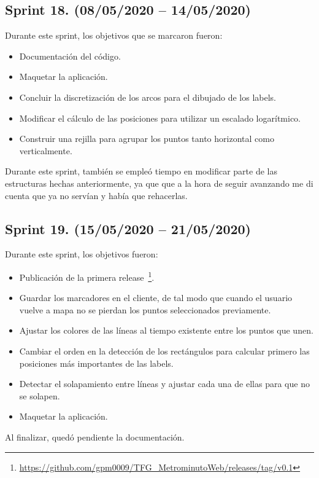 \subsection{Sprint 18. (08/05/2020 -- 14/05/2020)}
Durante este sprint, los objetivos que se marcaron fueron:
\begin{itemize}
	\item Documentación del código.
	\item Maquetar la aplicación.
	\item Concluir la discretización de los arcos para el dibujado de los labels.
	\item Modificar el cálculo de las posiciones para utilizar un escalado logarítmico.
	\item Construir una rejilla para agrupar los puntos tanto horizontal como verticalmente.
\end{itemize}
Durante este sprint, también se empleó tiempo en modificar parte de las estructuras hechas anteriormente, ya que que a la hora de seguir avanzando me di cuenta que ya no servían y había que rehacerlas. 

\subsection{Sprint 19. (15/05/2020 -- 21/05/2020)}
Durante este sprint, los objetivos fueron:
\begin{itemize}
	\item Publicación de la primera release~\footnote{\url{https://github.com/gpm0009/TFG_MetrominutoWeb/releases/tag/v0.1}}.
	\item Guardar los marcadores en el cliente, de tal modo que cuando el usuario vuelve a mapa no se pierdan los puntos seleccionados previamente.
	\item Ajustar los colores de las líneas al tiempo existente entre los puntos que unen.
	\item Cambiar el orden en la detección de los rectángulos para calcular primero las posiciones más importantes de las labels.
	\item Detectar el solapamiento entre líneas y ajustar cada una de ellas para que no se solapen.
	\item Maquetar la aplicación.
\end{itemize}
Al finalizar, quedó pendiente la documentación.

